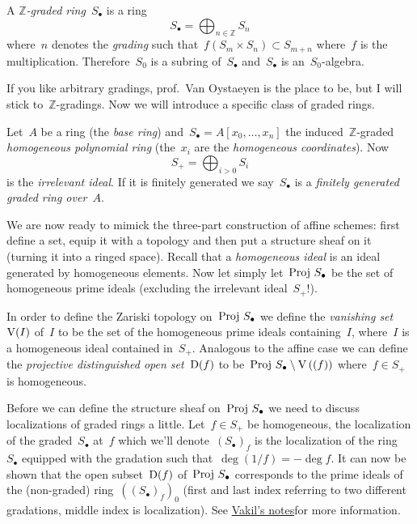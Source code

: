 \begin{definition}
  A \emph{$\mathbb{Z}$-graded ring}~$S_\bullet$ is a ring
  \begin{equation}
    S_\bullet=\bigoplus_{n\in\mathbb{Z}}S_n
  \end{equation}
  where~$n$ denotes the \emph{grading} such that~$f(S_m\times S_n)\subset S_{m+n}$ where~$f$ is the multiplication. Therefore~$S_0$ is a subring of~$S_\bullet$ and~$S_\bullet$ is an~$S_0$\nobreakdash-algebra.
\end{definition}

If you like arbitrary gradings, prof.\ Van Oystaeyen is the place to be, but I will stick to~$\mathbb{Z}$\nobreakdash-gradings. Now we will introduce a specific class of graded rings.

\begin{example}
  Let~$A$ be a ring (the \emph{base ring}) and~$S_\bullet=A[x_0,\ldots,x_n]$ the induced~$\mathbb{Z}$-graded \emph{homogeneous polynomial ring} (the~$x_i$ are the \emph{homogeneous coordinates}). Now
  \begin{equation}
    S_+=\bigoplus_{i>0}S_i
  \end{equation}
  is the \emph{irrelevant ideal}. If it is finitely generated we say~$S_\bullet$ is a \emph{finitely generated graded ring over~$A$}.
\end{example}

We are now ready to mimick the three-part construction of affine schemes: first define a set, equip it with a topology and then put a structure sheaf on it (turning it into a ringed space). Recall that a \emph{homogeneous ideal} is an ideal generated by homogeneous elements. Now let simply let~$\operatorname{Proj\,} S_\bullet$ be the set of homogeneous prime ideals (excluding the irrelevant ideal~$S_+$!).

In order to define the Zariski topology on~$\operatorname{Proj\,} S_\bullet$ we define the \emph{vanishing set~$\operatorname{V}(I)$} of~$I$ to be the set of the homogeneous prime ideals containing~$I$, where~$I$ is a homogeneous ideal contained in~$S_+$. Analogous to the affine case we can define the \emph{projective distinguished open set}~$\operatorname{D}(f)$ to be~$\operatorname{Proj\,} S_\bullet\setminus\operatorname{V}\left( (f) \right)$ where~$f\in S_+$ is homogeneous.

Before we can define the structure sheaf on~$\operatorname{Proj\,} S_\bullet$ we need to discuss localizations of graded rings a little. Let~$f\in S_+$ be homogeneous, the localization of the graded~$S_\bullet$ at~$f$ which we'll denote~$(S_\bullet)_f$ is the localization of the ring~$S_\bullet$ equipped with the gradation such that~$\deg(1/f)=-\deg f$. It can now be shown that the open subset~$\operatorname{D}(f)$ of~$\operatorname{Proj\,} S_\bullet$ corresponds to the prime ideals of the (non-graded) ring~$\left( (S_\bullet)_f \right)_0$ (first and last index referring to two different gradations, middle index is localization). See \iftex\cite{foag}\fi\ifblog\href{http://math216.wordpress.com}{Vakil's notes}\fi for more information.

